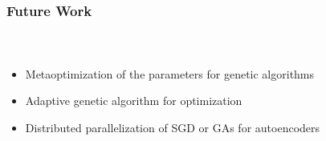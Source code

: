 
\begin{frame}[t]
	\frametitle{Future Work}
	\framesubtitle{~~}  %
	\begin{itemize}
		\item Metaoptimization of the parameters for genetic algorithms
		\item Adaptive genetic algorithm for optimization
		\item Distributed parallelization of SGD or GAs for autoencoders
	\end{itemize}

\end{frame}


